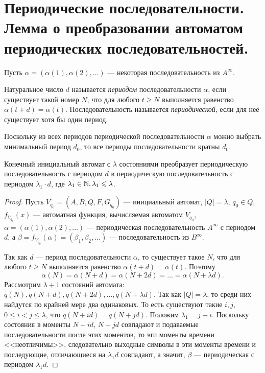 \section{Периодические последовательности. Лемма о преобразовании автоматом периодических последовательностей.}

Пусть $\alpha = (\alpha(1), \alpha(2), \ldots)$ --- некоторая последовательность из $A^{\infty}$.

\begin{definition}
    Натуральное число $d$ называется \textit{периодом} последовательности $\alpha$, если существует такой номер $N$, что для любого $t\geqslant N$ выполняется равенство $\alpha(t+d) = \alpha(t)$. Последовательность называется \textit{периодической}, если для неё существует хотя бы один период.
\end{definition}

Поскольку из всех периодов периодической последовательности $\alpha$ можно выбрать минимальный период $d_0$, то все периоды последовательности кратны $d_0$.

\begin{lemma}
    Конечный инициальный автомат с $\lambda$ состояниями преобразует периодическую последовательность с периодом $d$ в периодическую последовательность с периодом $\lambda_1 \cdot d$, где $\lambda_1\in \mathbb{N}, \lambda_1 \leqslant \lambda$.
\end{lemma}

\begin{proof}
    Пусть $V_{q_0} = (A, B, Q, F, G_{q_0})$ --- инициальный автомат, $|Q|=\lambda$, $q_0 \in Q$, $f_{V_{q_0}}(x)$ --- автоматная функция, вычисляемая автоматом $V_{q_0}$, $\alpha = (\alpha(1), \alpha(2), \ldots)$ --- периодическая последовательность $A^\infty$ с периодом $d$, а $\beta = f_{V_{q_0}}(\alpha) = (\beta_1, \beta_2, \ldots)$ --- последовательность из $B^{\infty}$.

    Так как $d$ --- период последовательности $\alpha$, то существует такое $N$, что для любого $t\geqslant N$ выполняется равенство $\alpha(t+d) = \alpha(t)$. Поэтому
    \[
        \alpha(N) = \alpha(N+d) = \alpha(N+2d) = \ldots = \alpha(N+\lambda d).
    \]
    Рассмотрим $\lambda+1$ состояний автомата: $q(N), q(N+d), q(N+2d), \ldots, q(N+\lambda d)$. Так как $|Q| = \lambda$, то среди них найдутся по крайней мере два одинаковых. То есть существуют такие $i, j$, $0\leqslant i < j  \leqslant \lambda$, что $q(N+id) = q(N+jd)$. Положим $\lambda_1 = j-i$. Поскольку состояния в моменты $N+id$, $N+jd$ совпадают и подаваемые последовательности после этих моментов, то эти моменты времени <<неотличимы>>, следовательно выходные символы в эти моменты времени и последующие, отличающиеся на $\lambda_1 d$ совпадают, а значит, $\beta$ --- периодическая с периодом $\lambda_1 d$.
\end{proof}

